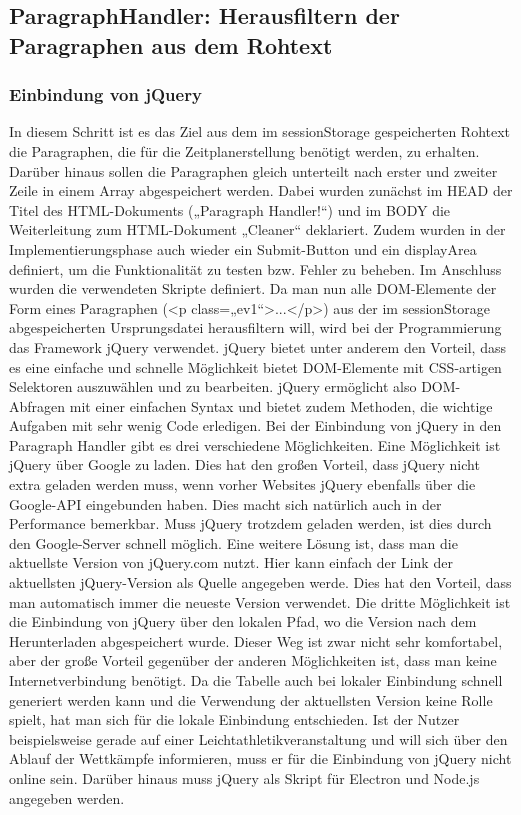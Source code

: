 {\subsection{ParagraphHandler: Herausfiltern der Paragraphen aus dem Rohtext}

\subsubsection{Einbindung von jQuery}
In diesem Schritt ist es das Ziel aus dem im sessionStorage gespeicherten Rohtext die Paragraphen, die für die Zeitplanerstellung benötigt werden, zu erhalten. Darüber hinaus sollen die Paragraphen gleich unterteilt nach erster und zweiter Zeile in einem Array abgespeichert werden. Dabei wurden zunächst im HEAD der Titel des HTML-Dokuments („Paragraph Handler!“) und im BODY die Weiterleitung zum HTML-Dokument „Cleaner“ deklariert. Zudem wurden in der Implementierungsphase auch wieder ein Submit-Button und ein displayArea definiert, um die Funktionalität zu testen bzw. Fehler zu beheben. Im Anschluss wurden die verwendeten Skripte definiert. Da man nun alle DOM-Elemente der Form eines Paragraphen (<p class=„ev1“>...</p>) aus der im sessionStorage abgespeicherten Ursprungsdatei herausfiltern will, wird bei der Programmierung das Framework jQuery verwendet. jQuery bietet unter anderem den Vorteil, dass es eine einfache und schnelle Möglichkeit bietet DOM-Elemente mit CSS-artigen Selektoren auszuwählen und zu bearbeiten. jQuery ermöglicht also DOM-Abfragen mit einer einfachen Syntax und bietet zudem Methoden, die wichtige Aufgaben mit sehr wenig Code erledigen. Bei der Einbindung von jQuery in den Paragraph Handler gibt es drei verschiedene Möglichkeiten. Eine Möglichkeit ist jQuery über Google zu laden. Dies hat den großen Vorteil, dass jQuery nicht extra geladen werden muss, wenn vorher Websites jQuery ebenfalls über die Google-API eingebunden haben. Dies macht sich natürlich auch in der Performance bemerkbar. Muss jQuery trotzdem geladen werden, ist dies durch den Google-Server schnell möglich. Eine weitere Lösung ist, dass man die aktuellste Version von jQuery.com nutzt. Hier kann einfach der Link der aktuellsten jQuery-Version als Quelle angegeben werde. Dies hat den Vorteil, dass man automatisch immer die neueste Version verwendet. Die dritte Möglichkeit ist die Einbindung von jQuery über den lokalen Pfad, wo die Version nach dem Herunterladen abgespeichert wurde. Dieser Weg ist zwar nicht sehr komfortabel, aber der große Vorteil gegenüber der anderen Möglichkeiten ist, dass man keine Internetverbindung benötigt. Da die Tabelle auch bei lokaler Einbindung schnell generiert werden kann und die Verwendung der aktuellsten Version keine Rolle spielt, hat man sich für die lokale Einbindung entschieden. Ist der Nutzer beispielsweise gerade auf einer Leichtathletikveranstaltung und will sich über den Ablauf der Wettkämpfe informieren, muss er für die Einbindung von jQuery nicht online sein. 
Darüber hinaus muss jQuery als Skript für Electron und Node.js angegeben werden. 

}
